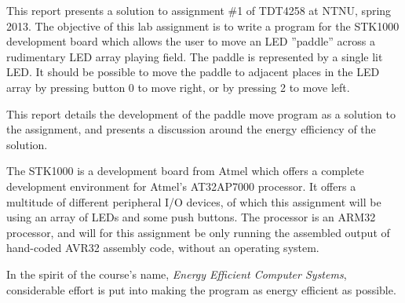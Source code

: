 This report presents a solution to assignment \#1 of TDT4258 at NTNU, spring 2013.  
The objective of this lab assignment is to write a program for the STK1000 development board which allows the user to move an LED ''paddle'' across a rudimentary LED array playing field.
The paddle is represented by a single lit LED.
It should be possible to move the paddle to adjacent places in the LED array by pressing button 0 to move right, or by pressing 2 to move left.

This report details the development of the paddle move program as a solution to the assignment, and presents a discussion around the energy efficiency of the solution.


The STK1000 is a development board from Atmel which offers a complete development environment for Atmel's AT32AP7000 processor. It offers a multitude of different peripheral I/O devices, of which this assignment will be using an array of LEDs and some push buttons. The processor is an ARM32 processor, and will for this assignment be only running the assembled output of hand-coded AVR32 assembly code, without an operating system.

In the spirit of the course's name, \emph{Energy Efficient Computer Systems}, considerable effort is put into making the program as energy efficient as possible.

